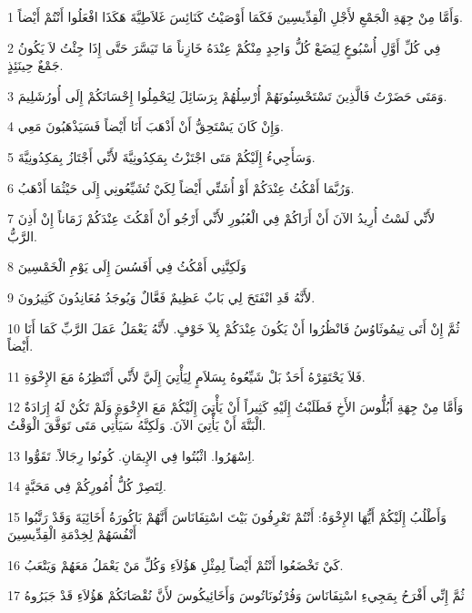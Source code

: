 \par 1 وَأَمَّا مِنْ جِهَةِ الْجَمْعِ لأَجْلِ الْقِدِّيسِينَ فَكَمَا أَوْصَيْتُ كَنَائِسَ غَلاَطِيَّةَ هَكَذَا افْعَلُوا أَنْتُمْ أَيْضاً.
\par 2 فِي كُلِّ أَوَّلِ أُسْبُوعٍ لِيَضَعْ كُلُّ وَاحِدٍ مِنْكُمْ عِنْدَهُ خَازِناً مَا تَيَسَّرَ حَتَّى إِذَا جِئْتُ لاَ يَكُونُ جَمْعٌ حِينَئِذٍ.
\par 3 وَمَتَى حَضَرْتُ فَالَّذِينَ تَسْتَحْسِنُونَهُمْ أُرْسِلُهُمْ بِرَسَائِلَ لِيَحْمِلُوا إِحْسَانَكُمْ إِلَى أُورُشَلِيمَ.
\par 4 وَإِنْ كَانَ يَسْتَحِقُّ أَنْ أَذْهَبَ أَنَا أَيْضاً فَسَيَذْهَبُونَ مَعِي.
\par 5 وَسَأَجِيءُ إِلَيْكُمْ مَتَى اجْتَزْتُ بِمَكِدُونِيَّةَ لأَنِّي أَجْتَازُ بِمَكِدُونِيَّةَ.
\par 6 وَرُبَّمَا أَمْكُثُ عِنْدَكُمْ أَوْ أُشَتِّي أَيْضاً لِكَيْ تُشَيِّعُونِي إِلَى حَيْثُمَا أَذْهَبُ.
\par 7 لأَنِّي لَسْتُ أُرِيدُ الآنَ أَنْ أَرَاكُمْ فِي الْعُبُورِ لأَنِّي أَرْجُو أَنْ أَمْكُثَ عِنْدَكُمْ زَمَاناً إِنْ أَذِنَ الرَّبُّ.
\par 8 وَلَكِنَّنِي أَمْكُثُ فِي أَفَسُسَ إِلَى يَوْمِ الْخَمْسِينَ
\par 9 لأَنَّهُ قَدِ انْفَتَحَ لِي بَابٌ عَظِيمٌ فَعَّالٌ وَيُوجَدُ مُعَانِدُونَ كَثِيرُونَ.
\par 10 ثُمَّ إِنْ أَتَى تِيمُوثَاوُسُ فَانْظُرُوا أَنْ يَكُونَ عِنْدَكُمْ بِلاَ خَوْفٍ. لأَنَّهُ يَعْمَلُ عَمَلَ الرَّبِّ كَمَا أَنَا أَيْضاً.
\par 11 فَلاَ يَحْتَقِرْهُ أَحَدٌ بَلْ شَيِّعُوهُ بِسَلاَمٍ لِيَأْتِيَ إِلَيَّ لأَنِّي أَنْتَظِرُهُ مَعَ الإِخْوَةِ.
\par 12 وَأَمَّا مِنْ جِهَةِ أَبُلُّوسَ الأَخِ فَطَلَبْتُ إِلَيْهِ كَثِيراً أَنْ يَأْتِيَ إِلَيْكُمْ مَعَ الإِخْوَةِ وَلَمْ تَكُنْ لَهُ إِرَادَةٌ الْبَتَّةَ أَنْ يَأْتِيَ الآنَ. وَلَكِنَّهُ سَيَأْتِي مَتَى تَوَفَّقَ الْوَقْتُ.
\par 13 اِسْهَرُوا. اثْبُتُوا فِي الإِيمَانِ. كُونُوا رِجَالاً. تَقَوُّوا.
\par 14 لِتَصِرْ كُلُّ أُمُورِكُمْ فِي مَحَبَّةٍ.
\par 15 وَأَطْلُبُ إِلَيْكُمْ أَيُّهَا الإِخْوَةُ: أَنْتُمْ تَعْرِفُونَ بَيْتَ اسْتِفَانَاسَ أَنَّهُمْ بَاكُورَةُ أَخَائِيَةَ وَقَدْ رَتَّبُوا أَنْفُسَهُمْ لِخِدْمَةِ الْقِدِّيسِينَ
\par 16 كَيْ تَخْضَعُوا أَنْتُمْ أَيْضاً لِمِثْلِ هَؤُلاَءِ وَكُلِّ مَنْ يَعْمَلُ مَعَهُمْ وَيَتْعَبُ.
\par 17 ثُمَّ إِنِّي أَفْرَحُ بِمَجِيءِ اسْتِفَانَاسَ وَفُرْتُونَاتُوسَ وَأَخَائِيكُوسَ لأَنَّ نُقْصَانَكُمْ هَؤُلاَءِ قَدْ جَبَرُوهُ
